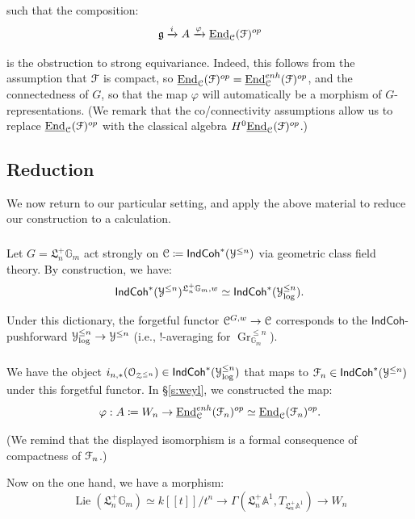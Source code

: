 \documentclass[reqno,11pt]{amsart}
\numberwithin{equation}{subsection}
\theoremstyle{remark}
\newcommand{\xar}[1]{\xrightarrow{#1}}
\newcommand{\bA}{{\mathbb A}}
\newcommand{\bG}{{\mathbb G}}
\newcommand{\sC}{{\EuScript C}}
\newcommand{\sF}{{\EuScript F}}
\newcommand{\sO}{{\EuScript O}}
\newcommand{\sY}{{\EuScript Y}}
\newcommand{\sZ}{{\EuScript Z}}
\newcommand{\fL}{{\mathfrak L}}
\newcommand{\fg}{{\mathfrak g}}
\newcommand{\on}{\operatorname}
\newcommand{\ul}{\underline}
\newcommand{\End}{\on{End}}
\newcommand{\vph}{\varphi}
\newcommand{\Gr}{\on{Gr}}
\newcommand{\IndCoh}{\mathsf{IndCoh}}
\newcommand{\Lie}{\on{Lie}}
\begin{document}
\noindent such that the composition:
%
\[
\fg \xar{i} A \xar{\vph} \ul{\End}_{\sC}(\sF)^{op}
\]

\noindent is the obstruction to strong equivariance. Indeed, this follows
from the assumption that $\sF$ is compact, so $\ul{\End}_{\sC}(\sF)^{op} = 
\ul{\End}_{\sC}^{enh}(\sF)^{op}$, and the connectedness of $G$, so that
the map $\vph$ will automatically be a morphism of $G$-representations.
(We remark that the co/connectivity assumptions allow us to replace 
$\ul{\End}_{\sC}(\sF)^{op}$ with the classical algebra 
$H^0\ul{\End}_{\sC}(\sF)^{op}$.)
 
\subsection{Reduction}

We now return to our particular setting, and apply the above material to 
reduce our construction to a calculation. 

\subsubsection{}

Let $G = \fL_n^+\bG_m$ act strongly on $\sC \coloneqq \IndCoh^*(\sY^{\leq n})$
via geometric class field theory. By construction, we have:
%
\[
\IndCoh^*(\sY^{\leq n})^{\fL_n^+\bG_m,w} \simeq  
\IndCoh^*(\sY_{\log}^{\leq n}).
\]

\noindent Under this dictionary, the forgetful functor 
$\sC^{G,w} \to \sC$ corresponds to the $\IndCoh$-pushforward 
$\sY_{\log}^{\leq n} \to \sY^{\leq n}$ (i.e., $!$-averaging
for $\Gr_{\bG_m}^{\leq n}$).

\subsubsection{}

We have the object $i_{n,*}(\sO_{\sZ^{\leq n}}) \in \IndCoh^*(\sY_{\log}^{\leq n})$
that maps to $\sF_n \in \IndCoh^*(\sY^{\leq n})$ under this forgetful functor.
In \S \ref{s:weyl}, we constructed the map:
%
\[
\vph:A \coloneqq W_n \to \ul{\End}_{\sC}^{enh}(\sF_n)^{op} \simeq 
\ul{\End}_{\sC}(\sF_n)^{op}.
\]

\noindent (We remind that the displayed isomorphism is a formal consequence
of compactness of $\sF_n$.)

Now on the one hand, we have a morphism: 
%
\[
\Lie(\fL_n^+\bG_m) \simeq k[[t]]/t^n \to \Gamma(\fL_n^+\bA^1,T_{\fL_n^+\bA^1}) 
\to W_n
\]
\end{document}
